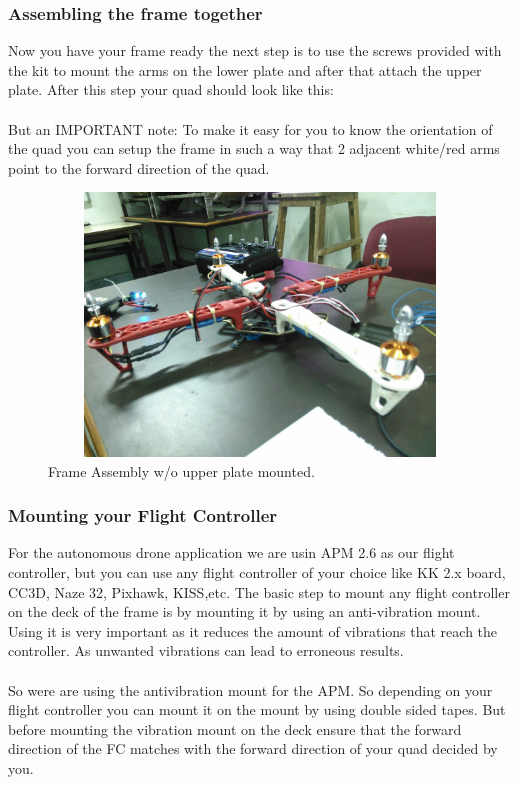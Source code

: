 \documentclass[a4paper,12pt,oneside]{book}
\begin{document}
		\subsubsection{Assembling the frame together}
		Now you have your frame ready the next step is to use the screws provided with the kit to mount the arms on the lower plate and after that attach the upper plate. After this step your quad should look like this:
		\paragraph{}But an IMPORTANT note: To make it easy for you to know the orientation of the quad you can setup the frame in such a way that 2 adjacent white/red arms point to the forward direction of the quad.
		\begin{figure}[H]
	 	
	 	\centering
		\includegraphics[width=12cm,height=7cm]{Frame}
		\caption{Frame Assembly w/o upper plate mounted.}
		\end{figure}
		
		\subsubsection{Mounting your Flight Controller}
		For the autonomous drone application we are usin APM 2.6 as our flight controller, but you can use any flight controller of your choice like KK 2.x board, CC3D, Naze 32, Pixhawk, KISS,etc. The basic step to mount any flight controller on the deck of the frame is by mounting it by using an anti-vibration mount. Using it is very important as it reduces the amount of vibrations that reach the controller. As unwanted vibrations can lead to erroneous results.
		\paragraph{}So were are using the antivibration mount for the APM. So depending on your flight controller you can mount it on the mount by using double sided tapes. But before mounting the vibration mount on the deck ensure that the forward direction of the FC matches with the forward direction of your quad decided by you.
		
\end{document}
